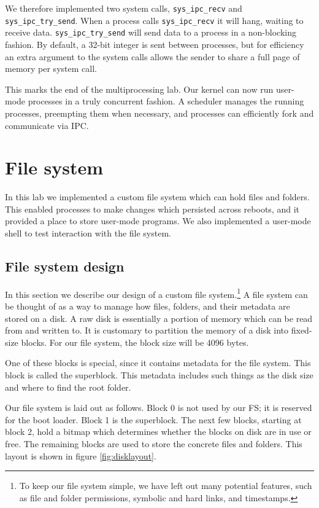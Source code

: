 \documentclass{report}
\begin{document}
We therefore implemented two system calls, \texttt{sys\_ipc\_recv} and
\texttt{sys\_ipc\_try\_send}. When a process calls \texttt{sys\_ipc\_recv} it
will hang, waiting to receive data. \texttt{sys\_ipc\_try\_send} will send
data to a process in a non-blocking fashion. By default, a 32-bit integer is
sent between processes, but for efficiency an extra argument to the system
calls allows the sender to share a full page of memory per system call.



This marks the end of the multiprocessing lab. Our kernel can now run
user-mode processes in a truly concurrent fashion. A scheduler manages the
running processes, preempting them when necessary, and processes can
efficiently fork and communicate via IPC.


\chapter{File system}
\label{sec:fs}
In this lab we implemented a custom file system which can hold files and
folders. This enabled processes to make changes which persisted across
reboots, and it provided a place to store user-mode programs. We also
implemented a user-mode shell to test interaction with the file system.

\section{File system design}
In this section we describe our design of
a custom file system.\footnote{
To keep our file system simple, we have left out many potential features, such
as file and folder permissions, symbolic and hard links, and timestamps.}
A file system can be thought of as a way to manage how files, folders, and
their metadata are stored on a disk. A raw disk is essentially a portion of
memory which can be read from and written to. It is customary to partition the
memory of a disk into fixed-size blocks. For our file system, the block size
will be 4096 bytes.

One of these blocks is special, since it contains metadata for the file
system. This block is called the superblock. This metadata includes such
things as the disk size and where to find the root folder.

Our file system is laid out as follows. Block 0 is not used by our FS; it is
reserved for the boot loader. Block 1 is the superblock. The next few blocks,
starting at block 2, hold a bitmap which determines whether the 
blocks on disk are in use or free. The remaining blocks are used to store the
concrete files and folders. This layout is shown in figure
\ref{fig:disklayout}.
\end{document}
